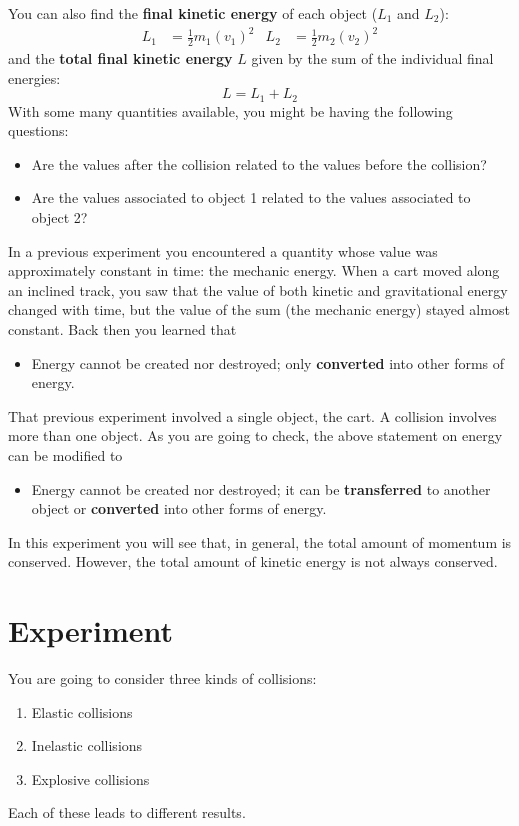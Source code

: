 You can also find the \textbf{final kinetic energy} of each object ($L_{1}$ and $L_{2}$):
\begin{align}
    L_{1} &= \frac{1}{2} m_{1} \left(v_{1}\right)^{2} & L_{2} &= \frac{1}{2} m_{2} \left(v_{2}\right)^{2}
\end{align}
and the \textbf{total final kinetic energy} $L$ given by the sum of the individual final energies:
\begin{equation}
    L = L_{1} + L_{2}
\end{equation}
With some many quantities available, you might be having the following questions:
\begin{itemize}
    \item Are the values after the collision related to the values before the collision?
    \item Are the values associated to object 1 related to the values associated to object 2?
\end{itemize}
In a previous experiment you encountered a quantity whose value was approximately constant in time: the mechanic energy. When a cart moved along an inclined track, you saw that the value of both kinetic and gravitational energy changed with time, but the value of the sum (the mechanic energy) stayed almost constant. Back then you learned that
\begin{itemize}
    \item Energy cannot be created nor destroyed; only \textbf{converted} into other forms of energy.
\end{itemize}
That previous experiment involved a single object, the cart. A collision involves more than one object. As you are going to check, the above statement on energy can be modified to
\begin{itemize}
    \item Energy cannot be created nor destroyed; it can be \textbf{transferred} to another object or \textbf{converted} into other forms of energy.
\end{itemize}
In this experiment you will see that, in general, the total amount of momentum is conserved. However, the total amount of kinetic energy is not always conserved.
%
\section{Experiment}
%
You are going to consider three kinds of collisions:
\begin{enumerate}
    \item Elastic collisions
    \item Inelastic collisions
    \item Explosive collisions
\end{enumerate}
Each of these leads to different results.
%
